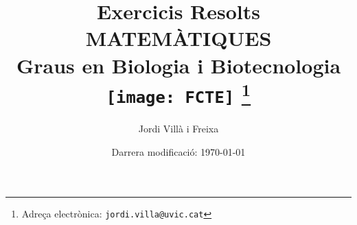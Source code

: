 \documentclass[12pt]{article}
\begin{document}



\title{Exercicis Resolts \\ \large MATEMÀTIQUES \\ Graus en Biologia i Biotecnologia \\[15pt] \texttt{[image: FCTE]}
\thanks{Adreça electrònica: \texttt{jordi.villa@uvic.cat}}}
\author{Jordi Villà i Freixa}
\date{Darrera modificació: \today}
\maketitle

\tableofcontents

\newpage


%
\end{document}
